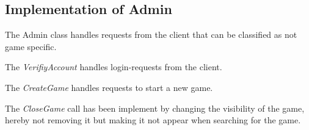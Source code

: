 \subsection{Implementation of Admin}
\label{sec:adminimpl}
The Admin class handles requests from the client that can be classified as not game specific. 

The \textit{VerifiyAccount} handles login-requests from the client.

The \textit{CreateGame} handles requests to start a new game.

The \textit{CloseGame} call has been implement by changing the visibility of the game, hereby not removing it but making it not appear when searching for the game. 